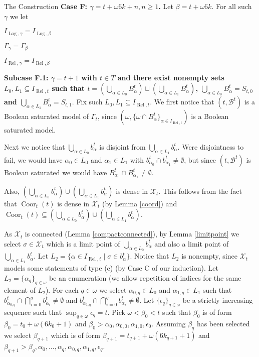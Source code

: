 \documentclass{amsart}
\theoremstyle{definition}\newtheorem{theorem}{Theorem}
\theoremstyle{definition}\newtheorem{bigtheorem}{Theorem}
\numberwithin{theorem}{section}
\theoremstyle{definition}\newtheorem{corollary}[theorem]{Corollary}
\theoremstyle{definition}\newtheorem{proposition}[theorem]{Proposition}
\theoremstyle{definition}\newtheorem{definition}[theorem]{Definition}
\theoremstyle{definition}\newtheorem{question}[theorem]{Question}
\theoremstyle{definition}\newtheorem{example}[theorem]{Example}
\theoremstyle{definition}\newtheorem{remark}[theorem]{Remark}
\theoremstyle{definition}\newtheorem{note}[theorem]{Note}
\theoremstyle{definition}\newtheorem{lemma}[theorem]{Lemma}
\theoremstyle{definition}\newtheorem{fact}[theorem]{Fact}
\theoremstyle{definition}\newtheorem{define}[theorem]{Definition}
\theoremstyle{definition}\newtheorem{definitions}[theorem]{Definitions}
\theoremstyle{definition}\newtheorem{claim}[theorem]{Claim}
\theoremstyle{definition}\newtheorem{obs}[theorem]{Observation}
\theoremstyle{definition}\newtheorem{construction}[theorem]{Construction}
\newcommand{\Rel}{\operatorname{Rel}}
\newcommand{\Log}{\operatorname{Log}}
\newcommand{\X}{\mathcal{X}}
\newcommand{\Coor}{\operatorname{Coor}}
\newcommand{\Bo}{\mathcal{B}}
\begin{document}
\begin{section}{The Construction}
\noindent \textbf{Case F: $\gamma = t + \omega 6k + n, n \geq 1$.}  Let $\beta = t + \omega 6k$.  For all such $\gamma$ we let 

\begin{center}

$I_{\Log, \gamma} = I_{\Log, \beta}$

$\Gamma_{\gamma} = \Gamma_{\beta}$

$I_{\Rel, \gamma} = I_{\Rel, \beta}$

\end{center}

\noindent \textbf{Subcase F.1:  $\gamma = t + 1$ with $t\in T$ and there exist nonempty sets $L_0, L_1 \subseteq I_{\Rel, t}$ such that $t = (\bigcup_{\alpha \in L_0} B_{\alpha}^t) \sqcup (\bigcup_{\alpha \in L_1} B_{\alpha}^t)$, $\bigcup_{\alpha \in L_0} B_{\alpha}^t = S_{t, 0}$ and $\bigcup_{\alpha \in L_1} B_{\alpha}^t = S_{t, 1}$}.  Fix such $L_0, L_1 \subseteq I_{\Rel, t}$.  We first notice that $(t , \Bo^t)$ is a Boolean saturated model of $\Gamma_t$, since $(\omega, \{\omega \cap B_{\alpha}^t\}_{\alpha \in I_{\Rel, t}})$ is a Boolean saturated model.

Next we notice that $\bigcup_{\alpha \in L_0} b_{\alpha}^t$ is disjoint from $\bigcup_{\alpha \in L_1} b_{\alpha}^t$.  Were disjointness to fail, we would have $\alpha_0 \in L_0$ and $\alpha_1 \in L_1$ with $b_{\alpha_0}^t \cap b_{\alpha_1}^t \neq \emptyset$, but since $(t , \Bo^t)$ is Boolean saturated we would have $B_{\alpha_0}^t \cap B_{\alpha_1}^t \neq \emptyset$.

Also, $(\bigcup_{\alpha \in L_0}b_{\alpha}^t) \cup (\bigcup_{\alpha \in L_1}b_{\alpha}^t)$ is dense in $\X_t$.  This follows from the fact that $\Coor_t(t)$ is dense in $\X_t$ (by Lemma \ref{coord}) and $\Coor_t(t) \subseteq (\bigcup_{\alpha \in L_0}b_{\alpha}^t) \cup (\bigcup_{\alpha \in L_1}b_{\alpha}^t)$.

As $\X_t$ is connected (Lemma \ref{compactconnected}), by Lemma \ref{limitpoint} we select $\sigma \in \X_t$ which is a limit point of $\bigcup_{\alpha \in L_0}b_{\alpha}^t$ and also a limit point of $\bigcup_{\alpha \in L_1}b_{\alpha}^t$.  Let $L_2 = \{\alpha \in I_{\Rel, t} \mid \sigma \in b_{\alpha}^t\}$.  Notice that $L_2$ is nonempty, since $\X_t$ models some statements of type (c) (by Case C of our induction).  Let $L_2 = \{\alpha_q\}_{q \in \omega}$ be an enumeration (we allow repetition of indices for the same element of $L_2$).  For each $q \in \omega$ we select $\alpha_{0, q} \in L_0$ and $\alpha_{1, q} \in L_1$ such that $b_{\alpha_{0, q}}^t \cap \bigcap_{i = 0}^q b_{\alpha_i}^t \neq \emptyset$ and $b_{\alpha_{1, q}}^t \cap \bigcap_{i = 0}^q b_{\alpha_i}^t \neq \emptyset$.  Let $\{\epsilon_q\}_{q \in \omega}$ be a strictly increasing sequence such that $\sup_{q \in \omega}\epsilon_q = t$.  Pick $\omega <\beta_0 < t$ such that $\beta_0$ is of form $\beta_0 = t_0 + \omega(6k_0+1)$ and $\beta_0 > \alpha_0, \alpha_{0, 0}, \alpha_{1, 0}, \epsilon_0$.  Assuming $\beta_q$ has been selected we select $\beta_{q+1}$ which is of form $\beta_{q+1} = t_{q+1} + \omega(6k_{q + 1} + 1)$ and $\beta_{q + 1} > \beta_q, \alpha_0, \ldots, \alpha_q, \alpha_{0, q}, \alpha_{1, q}, \epsilon_q$.


\end{section}
\end{document}
